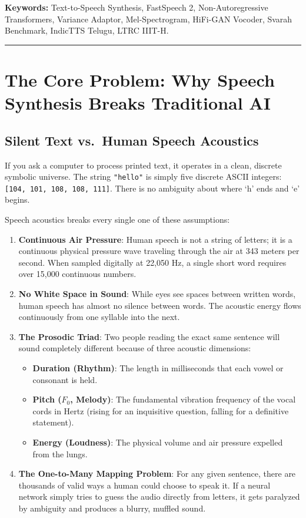 \documentclass[11pt,a4paper]{article}
\begin{document}
\vspace{0.5em}
\noindent \textbf{Keywords:} Text-to-Speech Synthesis, FastSpeech 2, Non-Autoregressive Transformers, Variance Adaptor, Mel-Spectrogram, HiFi-GAN Vocoder, Svarah Benchmark, IndicTTS Telugu, LTRC IIIT-H.

\vspace{0.8em}
\hrule
\vspace{1.2em}

\tableofcontents

\newpage

\section{The Core Problem: Why Speech Synthesis Breaks Traditional AI}

\subsection{Silent Text vs.\ Human Speech Acoustics}
If you ask a computer to process printed text, it operates in a clean, discrete symbolic universe. The string \texttt{"hello"} is simply five discrete ASCII integers: \texttt{[104, 101, 108, 108, 111]}. There is no ambiguity about where `h' ends and `e' begins.

Speech acoustics breaks every single one of these assumptions:
\begin{enumerate}
  \item \textbf{Continuous Air Pressure}: Human speech is not a string of letters; it is a continuous physical pressure wave traveling through the air at 343 meters per second. When sampled digitally at 22,050 Hz, a single short word requires over 15,000 continuous numbers.
  \item \textbf{No White Space in Sound}: While eyes see spaces between written words, human speech has almost no silence between words. The acoustic energy flows continuously from one syllable into the next.
  \item \textbf{The Prosodic Triad}: Two people reading the exact same sentence will sound completely different because of three acoustic dimensions:
  \begin{itemize}
    \item \textbf{Duration (Rhythm)}: The length in milliseconds that each vowel or consonant is held.
    \item \textbf{Pitch ($F_0$, Melody)}: The fundamental vibration frequency of the vocal cords in Hertz (rising for an inquisitive question, falling for a definitive statement).
    \item \textbf{Energy (Loudness)}: The physical volume and air pressure expelled from the lungs.
  \end{itemize}
  \item \textbf{The One-to-Many Mapping Problem}: For any given sentence, there are thousands of valid ways a human could choose to speak it. If a neural network simply tries to guess the audio directly from letters, it gets paralyzed by ambiguity and produces a blurry, muffled sound.
\end{enumerate}
\end{document}
